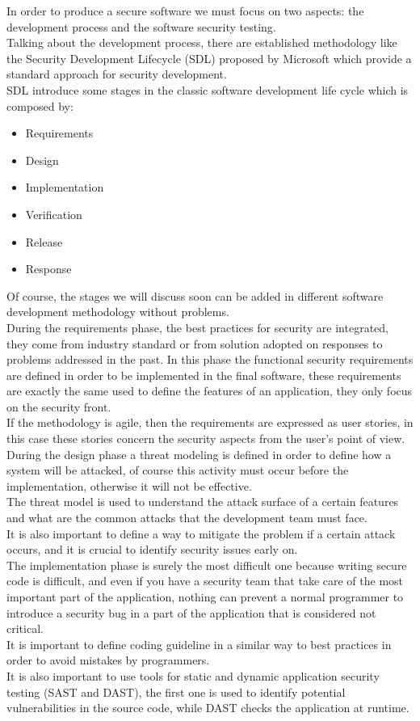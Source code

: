 In order to produce a secure software we must focus on two aspects: the development process and the software security testing.\\
Talking about the development process, there are established methodology like the Security Development Lifecycle (SDL) proposed by Microsoft\cite{microsoftsdl} which provide a standard approach for security development.\\
SDL introduce some stages in the classic software development life cycle which is composed by:
\begin{itemize}
	\item Requirements
	\item Design
	\item Implementation
	\item Verification
	\item Release
	\item Response
\end{itemize}
Of course, the stages we will discuss soon can be added in different software development methodology without problems.\\
During the requirements phase, the best practices for security are integrated, they come from industry standard or from
solution adopted on responses to problems addressed in the past.
In this phase the functional security requirements are defined in order to be implemented in the final software, 
these requirements are exactly the same used to define the features of an application, they only focus on the security front.\\
If the methodology is agile, then the requirements are expressed as user stories, in this case these stories concern the security aspects from the user's point of view.\\

During the design phase a threat modeling is defined in order to define how a system will be attacked, of course this
activity must occur before the implementation, otherwise it will not be effective.\\
The threat model is used to understand the attack surface of a certain features and what are the common attacks that
the development team must face.\\
It is also important to define a way to mitigate the problem if a certain attack occurs, and it is crucial to identify
security issues early on.\\

The implementation phase is surely the most difficult one because writing secure code is difficult, and even if you have
a security team that take care of the most important part of the application, nothing can prevent a normal programmer to introduce a security bug in a part of the application that is considered not critical.\\
It is important to define coding guideline in a similar way to best practices in order to avoid mistakes by programmers.\\
It is also important to use tools for static and dynamic application security testing (SAST and DAST), the first one is used to
identify potential vulnerabilities in the source code, while DAST checks the application at runtime.\\

